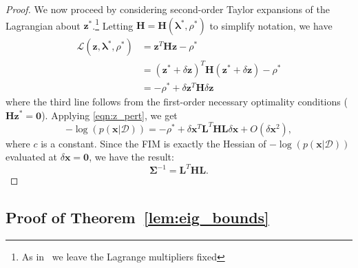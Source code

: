 \documentclass[lettersize,journal]{IEEEtran}
\begin{document}
\begin{proof}
We now proceed by considering second-order Taylor expansions of the Lagrangian about $\bm{z}^*$.\footnote{As in~\cite[Theorem 12.5]{nocedalNumericalOptimization2006} we leave the Lagrange multipliers fixed} Letting  $\bm{H}= \bm{H}(\bm{\lambda}^*, \rho^*)$ to simplify notation, we have
\begin{align*}
	\mathcal{L}(\bm{z},\bm{\lambda}^*, \rho^*) & =\bm{z}^T \bm{H} \bm{z} - \rho^* \\ 
	&= (\bm{z}^*+\delta\bm{z})^T \bm{H} (\bm{z}^*+\delta\bm{z}) - \rho^* \\ 
	&= -\rho^* + \delta\bm{z}^T \bm{H}\delta\bm{z}
\end{align*}
where the third line follows from the first-order necessary optimality conditions ($\bm{H} \bm{z}^*=\bm{0}$). Applying \eqref{eqn:z_pert}, we get
\begin{equation*}
	-\log(p(\bm{x} \vert \bm{\mathcal{D}})) = -\rho^* + \delta\bm{x}^T \bm{L}^T\bm{H}\bm{L}\delta\bm{x} + O(\delta\bm{x}^2),
\end{equation*}
where $c$ is a constant. Since the FIM is exactly the Hessian of $-\log(p(\bm{x} \vert \bm{\mathcal{D}}))$ evaluated at $\delta\bm{x} = \bm{0}$, we have the result:
\begin{equation}
	\bm{\Sigma}^{-1} = \bm{L}^T\bm{H}\bm{L}.
\end{equation}
\end{proof}

\subsection{Proof of Theorem~\ref{lem:eig_bounds}}\label{App:lem2Proof}
\end{document}
